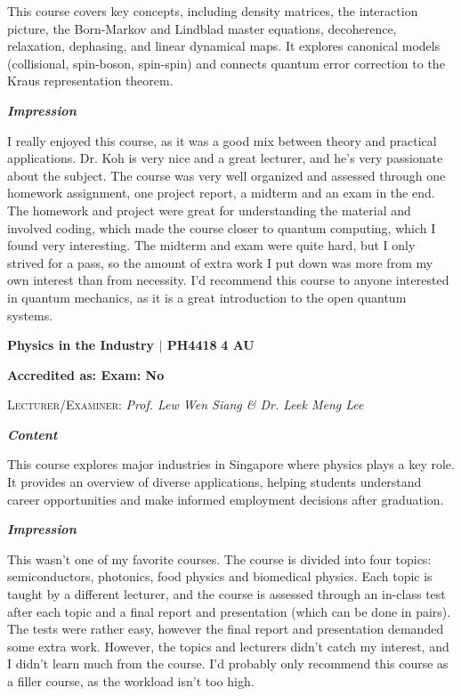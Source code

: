 This course covers key concepts, including density matrices, the interaction picture, the Born-Markov and Lindblad master equations, decoherence, relaxation, dephasing, and linear dynamical maps. It explores canonical models (collisional, spin-boson, spin-spin) and connects quantum error correction to the Kraus representation theorem.

{\large{\textbf{\textit{Impression}}}}
\vspace{-0.25cm}

I really enjoyed this course, as it was a good mix between theory and practical applications. Dr. Koh is very nice and a great lecturer, and he's very passionate about the subject. The course was very well organized and assessed through one homework assignment, one project report, a midterm and an exam in the end. The homework and project were great for understanding the material and involved coding, which made the course closer to quantum computing, which I found very interesting. The midterm and exam were quite hard, but I only strived for a pass, so the amount of extra work I put down was more from my own interest than from necessity. I'd recommend this course to anyone interested in quantum mechanics, as it is a great introduction to the open quantum systems.

\hrulefill

{\large{\textbf{Physics in the Industry $\vert$ PH4418} \hfill \textbf{4 AU}}}
\vspace{-0.3cm}

\textbf{Accredited as: \hfill Exam: No}

{\large{\textsc{Lecturer/Examiner:} \textit{Prof. Lew Wen Siang \& Dr. Leek Meng Lee}}} \vspace{0.3cm}

{\large{\textbf{\textit{Content}}}} 
\vspace{-0.25cm}

This course explores major industries in Singapore where physics plays a key role. It provides an overview of diverse applications, helping students understand career opportunities and make informed employment decisions after graduation.

{\large{\textbf{\textit{Impression}}}}
\vspace{-0.25cm}

This wasn't one of my favorite courses. The course is divided into four topics: semiconductors, photonics, food physics and biomedical physics. Each topic is taught by a different lecturer, and the course is assessed through an in-class test after each topic and a final report and presentation (which can be done in pairs). The tests were rather easy, however the final report and presentation demanded some extra work. However, the topics and lecturers didn't catch my interest, and I didn't learn much from the course. I'd probably only recommend this course as a filler course, as the workload isn't too high.

